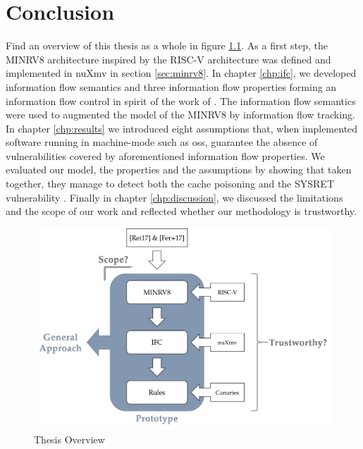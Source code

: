 
\chapter{Conclusion}
\label{chp:conclusion}

Find an overview of this thesis as a whole in figure \ref{fig:overview}.
As a first step, the MINRV8 architecture inspired by the RISC-V architecture was defined and implemented in nuXmv in section \ref{sec:minrv8}.
In chapter \ref{chp:ifc}, we developed information flow semantics and three information flow properties forming an information flow control in spirit of the work of \citeauthor{Ferraiuolo17} \cite{Ferraiuolo17}.
The information flow semantics were used to augmented the model of the MINRV8 by information flow tracking.
In chapter \ref{chp:results} we introduced eight assumptions that, when implemented software running in machine-mode such as \glspl{os}, guarantee the absence of vulnerabilities covered by aforementioned information flow properties.
We evaluated our model, the properties and the assumptions by showing that taken together, they manage to detect both the cache poisoning \cite{Wojtczuk09} and the SYSRET vulnerability \cite{Dunlap19}.
Finally in chapter \ref{chp:discussion}, we discussed the limitations and the scope of our work and reflected whether our methodology is trustworthy.

\begin{figure}
    \centering
    \includegraphics[width=\textwidth]{figures/thesis-overview.png}
    \caption{Thesis Overview}
    \label{fig:overview}
\end{figure}

